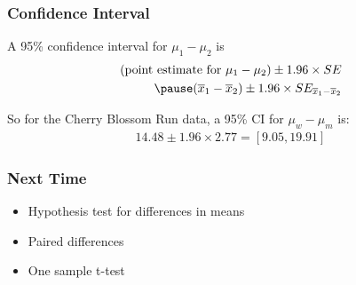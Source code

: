 \documentclass[handout]{beamer}
\newcommand{\xbar}{\overline{x}}
\begin{document}
\begin{frame}[fragile]
\frametitle{Confidence Interval}

A 95\% confidence interval for $\mu_1 - \mu_2$ is
\begin{eqnarray*}
(\mbox{point estimate for } \mu_1 - \mu_2) \pm 1.96 \times SE\\
\pause(\xbar_1 - \xbar_2) \pm 1.96 \times SE_{\xbar_1 - \xbar_2}
\end{eqnarray*}

\pause So for the Cherry Blossom Run data, a 95\% CI for $\mu_w - \mu_m$ is:
\begin{eqnarray*}
14.48 \pm 1.96 \times 2.77 =  [9.05, 19.91]
\end{eqnarray*}

\end{frame}





\begin{frame}[fragile]
\frametitle{Next Time}

\begin{itemize}
\item Hypothesis test for differences in means
\item Paired differences
\item One sample t-test
\end{itemize}


\end{frame}
\end{document}
